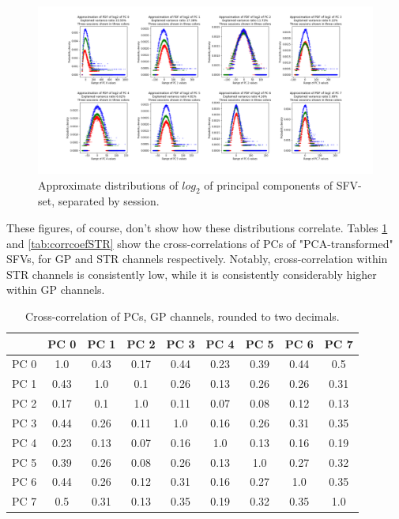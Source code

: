 \documentclass{kththesis}
\begin{document}
\begin{figure}[H]
    \centering
    \centerline{\includegraphics[width=1\textwidth]{images/PCA/PCAAnimalslg2.png}}
    \caption{Approximate distributions of \begin{math}log_2\end{math} of principal components of SFV-set, separated by session.}
    \label{fig:PCAAnimalslg2}
\end{figure}

These figures, of course, don't show how these distributions correlate.
Tables \ref{tab:corrcoefGP} and \ref{tab:corrcoefSTR} show the cross-correlations of PCs of "PCA-transformed" SFVs, for GP and STR channels respectively.
Notably, cross-correlation within STR channels is consistently low, while it is consistently considerably higher within GP channels.

\begin{table}[H]
    \centering
    \begin{tabular}{|c|c|c|c|c|c|c|c|c|}
    \hline
          & PC 0 & PC 1 & PC 2 & PC 3  & PC 4 & PC 5 & PC 6 & PC 7 \\ \hline
     PC 0 & 1.0  & 0.43 & 0.17 & 0.44  & 0.23 & 0.39 & 0.44 & 0.5  \\ \hline
     PC 1 & 0.43 & 1.0  & 0.1  & 0.26  & 0.13 & 0.26 & 0.26 & 0.31 \\ \hline
     PC 2 & 0.17 & 0.1  & 1.0  & 0.11  & 0.07 & 0.08 & 0.12 & 0.13 \\ \hline
     PC 3 & 0.44 & 0.26 & 0.11 & 1.0   & 0.16 & 0.26 & 0.31 & 0.35 \\ \hline
     PC 4 & 0.23 & 0.13 & 0.07 & 0.16  & 1.0  & 0.13 & 0.16 & 0.19 \\ \hline
     PC 5 & 0.39 & 0.26 & 0.08 & 0.26  & 0.13 & 1.0  & 0.27 & 0.32 \\ \hline
     PC 6 & 0.44 & 0.26 & 0.12 & 0.31  & 0.16 & 0.27 & 1.0  & 0.35 \\ \hline
     PC 7 & 0.5  & 0.31 & 0.13 & 0.35  & 0.19 & 0.32 & 0.35 & 1.0  \\ \hline
    \end{tabular}
    \caption{Cross-correlation of PCs, GP channels, rounded to two decimals.}
    \label{tab:corrcoefGP}
\end{table}
\end{document}
